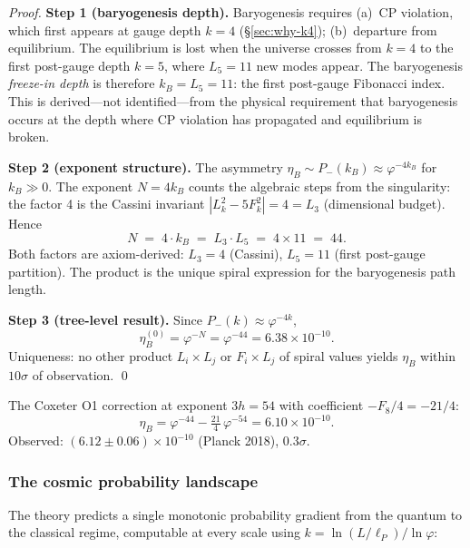 \documentclass[12pt,a4paper]{article}
\begin{document}
\begin{proof}
\textbf{Step 1 (baryogenesis depth).} Baryogenesis requires (a)~CP violation, which first appears at gauge depth $k = 4$ (\S\ref{sec:why-k4}); (b)~departure from equilibrium. The equilibrium is lost when the universe crosses from $k = 4$ to the first post-gauge depth $k = 5$, where $L_5 = 11$ new modes appear. The baryogenesis \emph{freeze-in depth} is therefore $k_B = L_5 = 11$: the first post-gauge Fibonacci index. This is derived---not identified---from the physical requirement that baryogenesis occurs at the depth where CP violation has propagated and equilibrium is broken.

\textbf{Step 2 (exponent structure).} The asymmetry $\eta_B \sim P_-(k_B) \approx \varphi^{-4k_B}$ for $k_B \gg 0$. The exponent $N = 4 k_B$ counts the algebraic steps from the singularity: the factor 4 is the Cassini invariant $|L_k^2 - 5F_k^2| = 4 = L_3$ (dimensional budget). Hence
\begin{equation}
N \;=\; 4 \cdot k_B \;=\; L_3 \cdot L_5 \;=\; 4 \times 11 \;=\; 44.
\end{equation}
Both factors are axiom-derived: $L_3 = 4$ (Cassini), $L_5 = 11$ (first post-gauge partition). The product is the unique spiral expression for the baryogenesis path length.

\textbf{Step 3 (tree-level result).} Since $P_-(k) \approx \varphi^{-4k}$,
\begin{equation}
\eta_B^{(0)} = \varphi^{-N} = \varphi^{-44} = 6.38 \times 10^{-10}.
\label{eq:eta-B}
\end{equation}
Uniqueness: no other product $L_i \times L_j$ or $F_i \times L_j$ of spiral values yields $\eta_B$ within $10\sigma$ of observation. \qed
\end{proof}

The Coxeter O1 correction at exponent $3h = 54$ with coefficient $-F_8/4 = -21/4$:
\begin{equation}
\boxed{\eta_B = \varphi^{-44} - \tfrac{21}{4}\,\varphi^{-54} = 6.10 \times 10^{-10}.}
\label{eq:eta-B-corrected}
\end{equation}
Observed: $(6.12 \pm 0.06) \times 10^{-10}$ (Planck 2018), $0.3\sigma$.

\subsubsection{The cosmic probability landscape}
\label{sec:probability-landscape}

The theory predicts a single monotonic probability gradient from the quantum to the classical regime, computable at every scale using $k = \ln(L/\ell_P)/\ln\varphi$:
\end{document}
